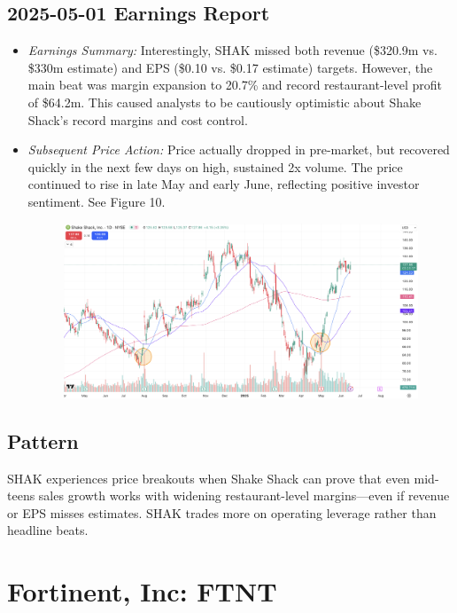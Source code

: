 \documentclass[11pt]{article}
\begin{document}
    \subsection{2025-05-01 Earnings Report}
        \begin{itemize}
            \item \textit{Earnings Summary:} Interestingly, SHAK missed both revenue (\$320.9m vs. \$330m estimate) and EPS (\$0.10 vs. \$0.17 estimate) targets. However, the main beat was margin expansion to 20.7\% and record restaurant-level profit of \$64.2m. This caused analysts to be cautiously optimistic about Shake Shack's record margins and cost control. 
            \item \textit{Subsequent Price Action:} Price actually dropped in pre-market, but recovered quickly in the next few days on high, sustained 2x volume. The price continued to rise in late May and early June, reflecting positive investor sentiment. See Figure 10.
            \begin{figure}[h]
                \centering \includegraphics[width=0.8\linewidth]{images/SHAK2.png}
                \caption{}
            \end{figure}
        \end{itemize}
    \subsection{Pattern}
        SHAK experiences price breakouts when Shake Shack can prove that even mid-teens sales growth works with widening restaurant-level margins---even if revenue or EPS misses estimates. SHAK trades more on operating leverage rather than headline beats.
\section{Fortinent, Inc: FTNT}
\end{document}

